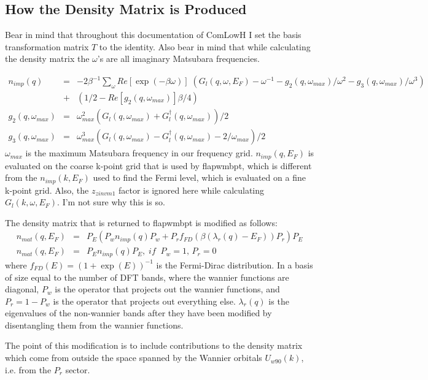 \documentclass[aps,prb,singlecolumn,preprintnumbers,amsmath,amssymb]{revtex4}
\begin{document}
\subsection{How the Density Matrix is Produced}
Bear in mind that throughout this documentation of ComLowH I set the basis transformation matrix $T$ to the identity.  Also bear in mind that while calculating the density matrix the $\omega$'s are all imaginary Matsubara frequencies.


\begin{eqnarray}
n_{imp}(q) &=& -2 \beta^{-1}\sum_{\omega} Re[\exp(-\beta \omega)] \;  (G_{l}(q,\omega,E_F) - \omega^{-1} - g_2(q,\omega_{max}) / \omega^2 - g_3(q,\omega_{max}) / \omega^3) \nonumber \\
&+&  (1/2 - Re[g_2(q,\omega_{max})] \beta/4) \nonumber \\
g_2(q,\omega_{max}) &=& \omega_{max}^2  (G_{l}(q,\omega_{max}) + G_{l}^\dagger(q,\omega_{max}))/2 \nonumber \\
g_3(q,\omega_{max}) &=& \omega_{max}^3  (G_{l}(q,\omega_{max}) - G_{l}^\dagger(q,\omega_{max})  - 2/\omega_{max})/2  \nonumber 
\end{eqnarray}
 $\omega_{max}$ is the maximum Matsubara frequency in our frequency grid. $n_{imp}(q,E_F)$ is evaluated on the coarse k-point grid that is used by flapwmbpt, which is different from the $n_{imp}(k,E_F)$  used to find the Fermi level, which is evaluated on a fine k-point grid.  Also, the $z_{zinvm1}$ factor is ignored here while calculating $G_{l}(k,\omega,E_F) $. I'm not sure why this is so.


The density matrix that is returned to flapwmbpt is modified as follows:
\begin{eqnarray}
n_{mat}(q, E_F) &= & P_E( P_w n_{imp}(q) P_w + P_r f_{FD}(\beta(\lambda_{r}(q)-E_F) )P_r) P_E  \nonumber \\ %
n_{mat}(q, E_F) &= & P_E n_{imp}(q) P_E, \; if \;\; P_w = 1, \, P_r = 0
\end{eqnarray}
where $f_{FD}(E) = (1 + \exp(E))^{-1}$ is the Fermi-Dirac distribution. In a basis of size equal to the number of DFT bands, where the wannier functions are diagonal, $P_w$ is the operator that projects out the wannier functions, and $P_r=1-P_w$ is the operator that projects out everything else. $\lambda_{r}(q)$ is the eigenvalues of the non-wannier bands after they have been modified by disentangling them from the wannier functions.

 The point of this modification is to include contributions to the density matrix which come from outside the space spanned by the Wannier orbitals $U_{w90}(k)$, i.e. from the $P_r$ sector. 
\end{document}
